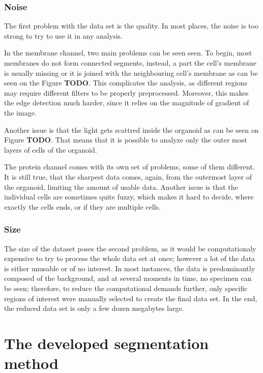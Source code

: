 \documentclass[
  digital,     %
  oneside,     %
  nosansbold,  %
  nocolorbold, %
  lof,         %
  lot,         %
]{fithesis4}
\begin{document}
\subsection{Noise}

The first problem with the data set is the quality. In most places, the noise is
too strong to try to use it in any analysis.

In the membrane channel, two main problems can be seen seen. To begin, most
membranes do not form connected segments, instead, a part the cell's membrane is
usually missing or it is joined with the neighbouring cell's membrane as can be
seen on the Figure \textbf{TODO}. This complicates the analysis, as different
regions may require different filters to be properly preprocessed. Moreover,
this makes the edge detection much harder, since it relies on the magnitude of
gradient of the image.

Another issue is that the light gets scattred inside the organoid as can be seen
on Figure \textbf{TODO}. That means that it is possible to analyze only the
outer most layers of cells of the organoid.

The protein channel comes with its own set of problems, some of them different.
It is still true, that the sharpest data comes, again, from the outermost layer
of the organoid, limiting the amount of usable data. Another issue is that the
individual cells are sometimes quite fuzzy, which makes it hard to decide, where
exactly the cells ends, or if they are multiple cells.

\subsection{Size}

The size of the dataset poses the second problem, as it would be computationaly
expensive to try to process the whole data set at once; however a lot of the
data is either unusable or of no interest. In most instances, the data is
predominantly composed of the background, and at several moments in time, no
specimen can be seen; therefore, to reduce the computational demands further,
only specific regions of interest were manually selected to create the final
data set. In the end, the reduced data set is only a few dozen megabytes large.

\chapter{The developed segmentation method}
\end{document}
